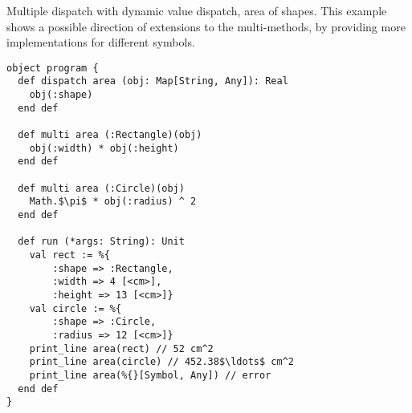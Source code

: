 \example Multiple dispatch with dynamic value dispatch, area of shapes. This example shows a possible direction of extensions to the multi-methods, by providing more implementations for different symbols. 
\begin{lstlisting}
object program {
  def dispatch area (obj: Map[String, Any]): Real
    obj(:shape)
  end def
  
  def multi area (:Rectangle)(obj)
    obj(:width) * obj(:height)
  end def
  
  def multi area (:Circle)(obj)
    Math.$\pi$ * obj(:radius) ^ 2
  end def
  
  def run (*args: String): Unit
    val rect := %{
        :shape => :Rectangle,
        :width => 4 [<cm>],
        :height => 13 [<cm>]}
    val circle := %{
        :shape => :Circle,
        :radius => 12 [<cm>]}
    print_line area(rect) // 52 cm^2
    print_line area(circle) // 452.38$\ldots$ cm^2
    print_line area(%{}[Symbol, Any]) // error
  end def
}
\end{lstlisting}















